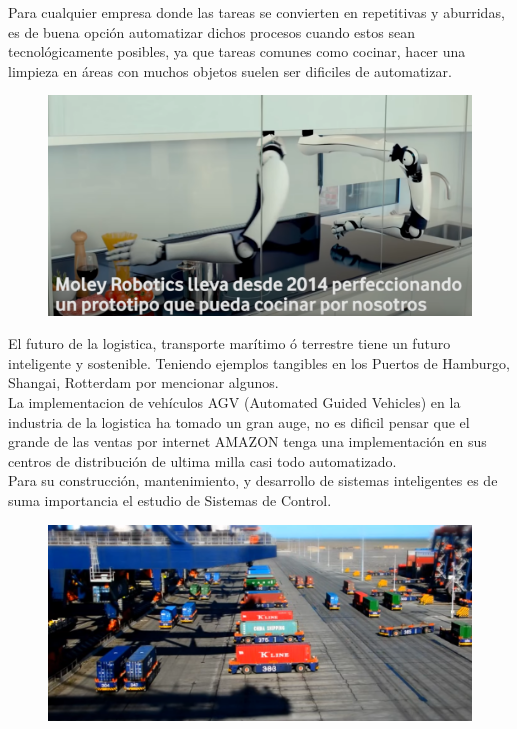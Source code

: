 \documentclass[
	12pt, %
]{fphw}
\begin{document}
Para cualquier empresa donde las tareas se convierten en repetitivas y aburridas, es de buena opción automatizar dichos procesos cuando estos sean tecnológicamente posibles, ya que tareas comunes como cocinar, hacer una limpieza en áreas con muchos objetos suelen ser dificiles de automatizar.\\

\begin{figure}[H]
  \centering
  \includegraphics[scale=0.4]{images/hard.png}
\end{figure}

El futuro de la logistica, transporte marítimo ó terrestre tiene un futuro inteligente y sostenible. Teniendo ejemplos tangibles en los Puertos de Hamburgo, Shangai, Rotterdam por mencionar algunos.\\

La implementacion de vehículos AGV (Automated Guided Vehicles) en la industria de la logistica ha tomado un gran auge, no es dificil pensar que el grande de las ventas por internet AMAZON tenga una implementación en sus centros de distribución de ultima milla casi todo automatizado.\\

Para su construcción, mantenimiento, y desarrollo de sistemas inteligentes es de suma importancia el estudio de Sistemas de Control.

\begin{figure}[H]
  \centering
  \includegraphics[scale=0.4]{images/agv.png}
\end{figure}
\end{document}

